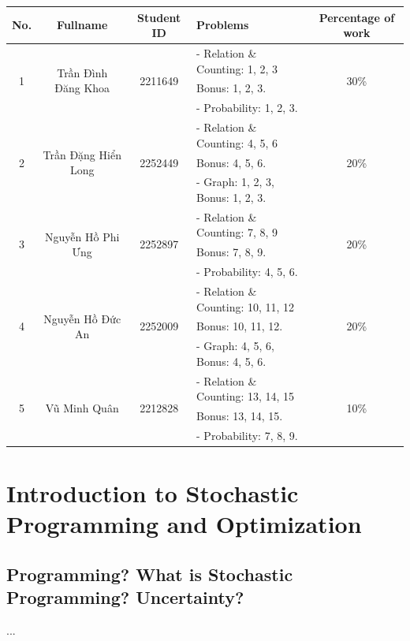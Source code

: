 \documentclass[a4paper]{article}
\begin{document}
\begin{center}
\begin{tabular}{|c|c|c|l|c|}
\hline
\textbf{No.} & \textbf{Fullname} & \textbf{Student ID} & \textbf{Problems} & \textbf{Percentage of work}\\
\hline 
\multirow{3}{*}{1} & \multirow{3}{*}{Trần Đình Đăng Khoa} & \multirow{3}{*}{2211649} & - Relation \& Counting: 1, 2, 3& \multirow{3}{*}{30\%}\\
 & &  & Bonus: 1, 2, 3. &\\
 & &  & - Probability: 1, 2, 3. &\\
\hline 
\multirow{3}{*}{2} & \multirow{3}{*}{Trần Đặng Hiển Long} & \multirow{3}{*}{2252449} & - Relation \& Counting: 4, 5, 6& \multirow{3}{*}{20\%}\\
 & &  & Bonus: 4, 5, 6. &\\
 & &  & - Graph: 1, 2, 3, Bonus: 1, 2, 3. &\\
\hline
\multirow{3}{*}{3} & \multirow{3}{*}{Nguyễn Hồ Phi Ưng} & \multirow{3}{*}{2252897} & - Relation \& Counting: 7, 8, 9& \multirow{3}{*}{20\%}\\
 & &  & Bonus: 7, 8, 9. &\\
 & &  & - Probability: 4, 5, 6. &\\
\hline
\multirow{3}{*}{4} & \multirow{3}{*}{Nguyễn Hồ Đức An} & \multirow{3}{*}{2252009} & - Relation \& Counting: 10, 11, 12& \multirow{3}{*}{20\%}\\
 & &  & Bonus: 10, 11, 12. &\\
 & &  & - Graph: 4, 5, 6, Bonus: 4, 5, 6. &\\
\hline
\multirow{3}{*}{5} & \multirow{3}{*}{Vũ Minh Quân} & \multirow{3}{*}{2212828} & - Relation \& Counting: 13, 14, 15& \multirow{3}{*}{10\%}\\
 & &  & Bonus: 13, 14, 15. &\\
 & &  & - Probability: 7, 8, 9. &\\
\hline
\end{tabular}
\end{center}

\section{Introduction to Stochastic Programming and Optimization}
	\subsection{Programming? What is Stochastic Programming? Uncertainty?}
	...
	
\end{document}
